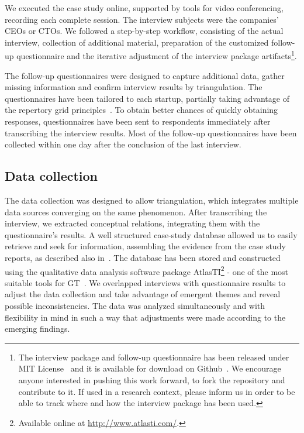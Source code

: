 \documentclass[10pt,journal,letterpaper,compsoc]{IEEEtran}
\begin{document}
We executed the case study online, supported by tools for video conferencing,
recording each complete session. The interview subjects were the companies' CEOs
or CTOs. We followed a step-by-step workflow, consisting of the actual
interview, collection of additional material, preparation of the customized
follow-up questionnaire and the iterative adjustment of the interview package
artifacts\footnote{The interview package and follow-up questionnaire has been
released under MIT License~\cite{MITLicense} and it is available for download on
Github~\cite{GitHubInterviewPackage}. We encourage anyone interested in pushing
this work forward, to fork the repository and contribute to it. If used in a
research context, please inform us in order to be able to track where and how
the interview package has been used.}.

The follow-up questionnaires were designed to capture additional data, gather
missing information and confirm interview results by triangulation. The
questionnaires have been tailored to each startup, partially taking advantage of
the repertory grid principles~\cite{Edwards2009}. To obtain better chances of
quickly obtaining responses, questionnaires have been sent to respondents
immediately after transcribing the interview results. Most of the follow-up
questionnaires have been collected within one day after the conclusion of the
last interview.  

\subsection{Data collection} The data collection was designed to allow
triangulation, which integrates multiple data sources converging on the same
phenomenon. After transcribing the interview, we extracted conceptual
relations, integrating them with the questionnaire's results. A well structured
case-study database allowed us to easily retrieve and seek for information,
assembling the evidence from the case study reports, as described also 
in~\cite{Yin1994}. The database has been stored and constructed using the
qualitative data analysis software package AtlasTI\footnote{Available online at
\url{http://www.atlasti.com/}.} - one of the most suitable tools for 
GT~\cite{Coleman2007}. We overlapped interviews with questionnaire results to
adjust the data collection and take advantage of emergent themes and reveal
possible inconsistencies. The data was analyzed simultaneously and with
flexibility in mind in such a way that adjustments were made according to the
emerging findings.
\end{document}
